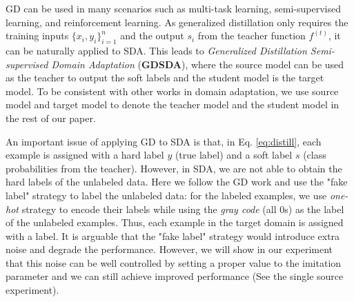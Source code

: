 GD can be used in many scenarios such as multi-task learning, semi-supervised learning, and reinforcement learning. As generalized distillation only requires the training inputs $\{x_i,y_i\}_{i=1}^n$ and the output $s_i$ from the teacher function $f^{(t)}$, it can be naturally applied to SDA. This leads to \textit{Generalized Distillation Semi-supervised Domain Adaptation} (\textbf{GDSDA}), where the source model can be used as the teacher to output the soft labels and the student model is the target model. To be consistent with other works in domain adaptation, we use source model and target model to denote the teacher model and the student model in the rest of our paper.

An important issue of applying GD to SDA is that, in Eq. \eqref{eq:distill}, each example is assigned with a hard label $y$ (true label) and a soft label $s$ (class probabilities from the teacher). However, in SDA, we are not able to obtain the hard labels of the unlabeled data. Here we follow the GD work\cite{lopez2015unifying} and use the "fake label" strategy to label the unlabeled data: for the labeled examples, we use \textit{one-hot} strategy to encode their labels while using the \textit{gray code} (all 0s) as the label of the unlabeled examples. Thus, each example in the target domain is assigned with a label. It is arguable that the "fake label" strategy would introduce extra noise and degrade the performance. However, we will show in our experiment that this noise can be well controlled by setting a proper value to the imitation parameter and we can still achieve improved performance (See the single source experiment).

